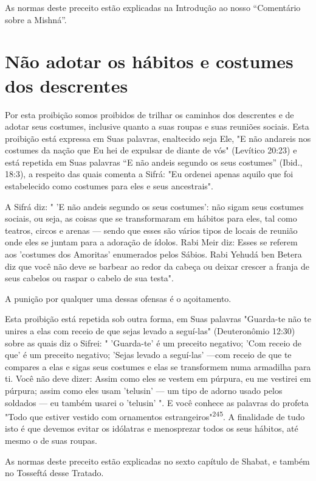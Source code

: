 As normas deste preceito estão explicadas na Introdução ao nosso
``Comentário sobre a Mishná''.

\section{Não adotar os hábitos e costumes dos descrentes}

Por esta proibição somos proibidos de trilhar os caminhos dos
des­crentes e de adotar seus costumes, inclusive quanto a suas roupas e
suas reu­niões sociais. Esta proibição está expressa em Suas palavras,
enaltecido seja Ele, "E não andareis nos costumes da nação que Eu hei de
expulsar de diante de vós" (Levítico 20:23) e está repetida em Suas
palavras ``E não andeis segundo os seus costumes'' (Ibid., 18:3), a
respeito das quais comenta a Sifrá: "Eu ordenei ape­nas aquilo que foi
estabelecido como costumes para eles e seus ancestrais".

A Sifrá diz: " 'E não andeis segundo os seus costumes': não sigam seus
costumes sociais, ou seja, as coisas que se transformaram em hábitos
para eles, tal como teatros, circos e arenas --- sendo que esses são
vários tipos de locais de reunião onde eles se juntam para a adoração de
ídolos. Rabi Meir diz: Esses se referem aos 'costumes dos Amoritas'
enumerados pelos Sábios. Rabi Yehudá ben Betera diz que você não deve se
barbear ao redor da cabeça ou deixar crescer a franja de seus cabelos ou
raspar o cabelo de sua testa".

A punição por qualquer uma dessas ofensas é o açoitamento.

Esta proibição está repetida sob outra forma, em Suas palavras
"Guarda-te não te unires a elas com receio de que sejas levado a
seguí-las" (Deu­teronômio 12:30) sobre as quais diz o Sifrei: "
'Guarda-te' é um preceito nega­tivo; 'Com receio de que' é um preceito
negativo; 'Sejas levado a seguí-las' ---com receio de que te compares a
elas e sigas seus costumes e elas se transfor­mem numa armadilha para
ti. Você não deve dizer: Assim como eles se vestem em púrpura, eu me
vestirei em púrpura; assim como eles usam 'telusin' --- um tipo de
adorno usado pelos soldados --- eu também usarei o 'telusin' ". E você
conhece as palavras do profeta "Todo que estiver vestido com ornamentos
es­trangeiros"\textsuperscript{245}. A finalidade de tudo isto é que
devemos evitar os idólatras e menosprezar todos os seus hábitos, até
mesmo o de suas roupas.

As normas deste preceito estão explicadas no sexto capítulo de Sha­bat,
e também no Tosseftá desse Tratado.

